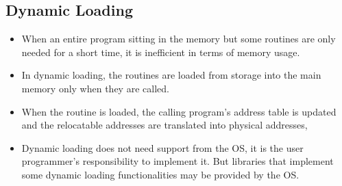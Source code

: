 \documentclass{article}
\theoremstyle{plain}
\theoremstyle{definition}
\begin{document}
\subsection{Dynamic Loading}
\begin{itemize}
    \item When an entire program sitting in the memory but some routines are only needed for a short time, it is inefficient in terms of memory usage.
    
    \item In dynamic loading, the routines are loaded from storage into the main memory only when they are called. 
    
    \item When the routine is loaded, the calling program's address table is updated and the relocatable addresses are translated into physical addresses, 
    
    \item Dynamic loading does not need support from the OS, it is the user programmer's responsibility to implement it. But libraries that implement some dynamic loading functionalities may be provided by the OS. 
\end{itemize}
\end{document}
